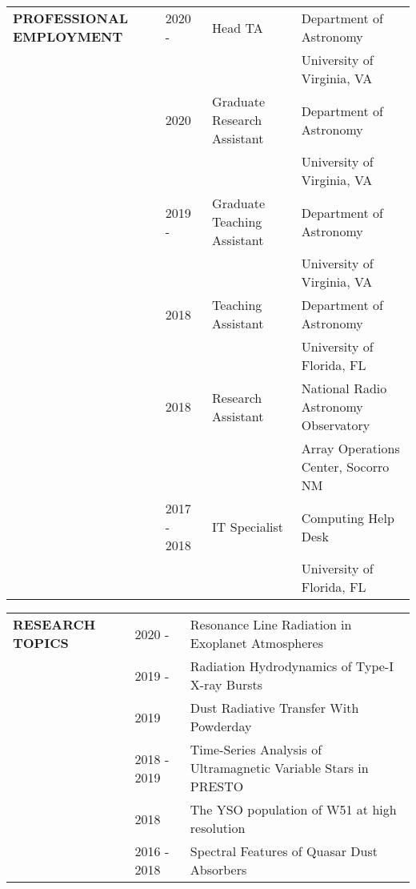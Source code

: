 \documentclass{article}
\begin{document}
\vspace{0.5cm}
\begin{tabular}{p{4cm}p{2.2cm}ll}
    \large{\textbf{PROFESSIONAL EMPLOYMENT}}
    &2020 - & Head TA            & Department of Astronomy \vspace{-0.45cm} \\
    &       &                    & \small University of Virginia, VA \vspace{0.125cm} \\ 
    &2020   & Graduate Research Assistant & Department of Astronomy \\
    &       &                    & \small University of Virginia, VA \vspace{0.125cm} \\ 
    &2019 - & Graduate Teaching Assistant & Department of Astronomy \\
    &       &                    & \small University of Virginia, VA \vspace{0.125cm} \\ 
    &2018   & Teaching Assistant & Department of Astronomy \\
    &       &                    & \small University of Florida, FL \vspace{0.125cm} \\ 
    &2018   & Research Assistant & National Radio Astronomy Observatory \\
    &       &                    & \small Array Operations Center, Socorro NM \vspace{0.125cm} \\ 
    &2017 - 2018 & IT Specialist & Computing Help Desk \\
    &       &                    & \small University of Florida, FL \vspace{0.125cm} \\ 
\end{tabular}
\vspace{0.5cm}





\begin{tabular}{p{4cm}p{2.2cm}l}
    \large{\textbf{RESEARCH \newline TOPICS}}&2020 - & Resonance Line Radiation in Exoplanet Atmospheres \vspace{-0.45cm}\\
    &2019 - & Radiation Hydrodynamics of Type-I X-ray Bursts\\
    &2019 & Dust Radiative Transfer With Powderday \\
    &2018 - 2019 & Time-Series Analysis of Ultramagnetic Variable Stars in PRESTO\\
    &2018 & The YSO population of W51 at high resolution \\
    &2016 - 2018 & Spectral Features of Quasar Dust Absorbers \\
\end{tabular}
\vspace{0.5cm}
\end{document}

